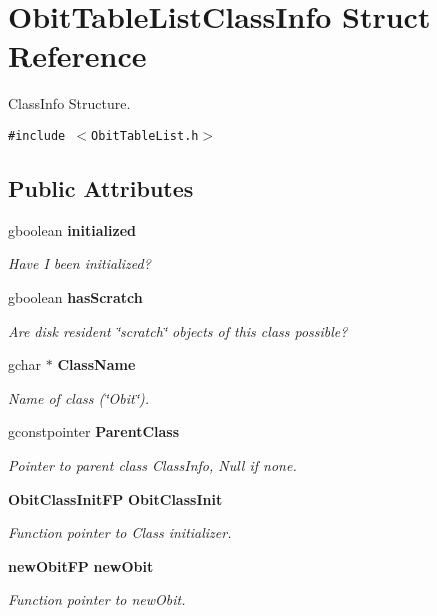 \section{Obit\-Table\-List\-Class\-Info Struct Reference}
\label{structObitTableListClassInfo}
Class\-Info Structure.  


{\tt \#include $<$Obit\-Table\-List.h$>$}

\subsection*{Public Attributes}
\begin{CompactItemize}
\item 
gboolean {\bf initialized}
\begin{CompactList}\small\item\em Have I been initialized? \item\end{CompactList}\item 
gboolean {\bf has\-Scratch}
\begin{CompactList}\small\item\em Are disk resident \char`\"{}scratch\char`\"{} objects of this class possible? \item\end{CompactList}\item 
gchar $\ast$ {\bf Class\-Name}
\begin{CompactList}\small\item\em Name of class (\char`\"{}Obit\char`\"{}). \item\end{CompactList}\item 
gconstpointer {\bf Parent\-Class}
\begin{CompactList}\small\item\em Pointer to parent class Class\-Info, Null if none. \item\end{CompactList}\item 
{\bf Obit\-Class\-Init\-FP} {\bf Obit\-Class\-Init}
\begin{CompactList}\small\item\em Function pointer to Class initializer. \item\end{CompactList}\item 
{\bf new\-Obit\-FP} {\bf new\-Obit}
\begin{CompactList}\small\item\em Function pointer to new\-Obit. \item\end{CompactList}\item 

\end{CompactItemize}
